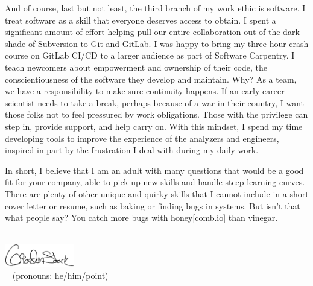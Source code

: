 \documentclass[10pt,letterpaper,sans]{moderncv/moderncv} %
\makeatletter
\renewcommand*{\makeletterclosing}{
  \@closing\\[0.5em]%
  \includegraphics[height=1cm]{pictures/signature}\\%
  {\bfseries \@firstname~\@lastname} (pronouns: he/him/point)%
  \ifthenelse{\isundefined{\@enclosure}}{}{%
    \\%
    \vfill%
    {\color{color2}\itshape\enclname: \@enclosure}}}
\makeatother
\begin{document}
And of course, last but not least, the third branch of my work ethic is software. I treat software as a skill that everyone deserves access to obtain. I spent a significant amount of effort helping pull our entire collaboration out of the dark shade of Subversion to Git and GitLab. I was happy to bring my three-hour crash course on GitLab CI/CD to a larger audience as part of Software Carpentry. I teach newcomers about empowerment and ownership of their code, the conscientiousness of the software they develop and maintain. Why? As a team, we have a responsibility to make sure continuity happens. If an early-career scientist needs to take a break, perhaps because of a war in their country, I want those folks not to feel pressured by work obligations. Those with the privilege can step in, provide support, and help carry on. With this mindset, I spend my time developing tools to improve the experience of the analyzers and engineers, inspired in part by the frustration I deal with during my daily work.

In short, I believe that I am an adult with many questions that would be a good fit for your company, able to pick up new skills and handle steep learning curves. There are plenty of other unique and quirky skills that I cannot include in a short cover letter or resume, such as baking or finding bugs in systems. But isn't that what people say? You catch more bugs with honey[comb.io] than vinegar.

\makeletterclosing
\end{document}
